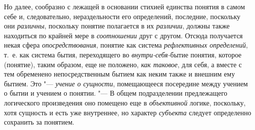 Но далее, сообразно с лежащей в основании стихией единства понятия в самом
себе и, следовательно, нераздельности его определений, последние, поскольку
они {\em различны}, поскольку понятие полагается в их
{\em различии}, должны также находиться по крайней мере
в {\em соотношении} друг с другом. Отсюда получается
некая сфера {\em опосредствования}, понятие как система
{\em рефлективных определений}, т.~е. как система
бытия, переходящего во {\em внутри-себя-}бытие понятия,
которое (понятие), таким образом, еще не положено,
{\em как таковое}, для себя, а вместе с тем обременено
непосредственным бытием как неким также и внешним ему бытием. Это
"--- {\em учение о сущности}, помещающееся посередине
между учением о бытии и учением о понятии. "--- В общем подразделении
предлежащего логического произведения оно помещено еще в
{\em объективной} логике, поскольку, хотя сущность и
есть уже внутреннее, но характер {\em субъекта} следует
определенно сохранить за понятием.

